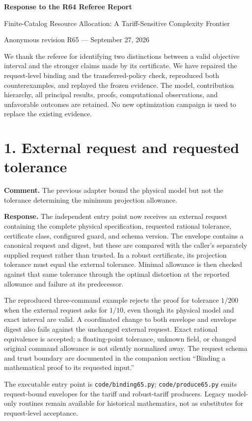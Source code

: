 \documentclass[11pt,letterpaper]{article}
\begin{document}
\begin{center}{\Large\bfseries Response to the R64 Referee Report}\par
Finite-Catalog Resource Allocation: A Tariff-Sensitive Complexity Frontier\par
Anonymous revision R65 --- September 27, 2026\end{center}
We thank the referee for identifying two distinctions between a valid objective interval and the stronger claims made by its certificate. We have repaired the request-level binding and the transferred-policy check, reproduced both counterexamples, and replayed the frozen evidence. The model, contribution hierarchy, all principal results, proofs, computational observations, and unfavorable outcomes are retained. No new optimization campaign is used to replace the existing evidence.

\section*{1. External request and requested tolerance}
\textbf{Comment.} The previous adapter bound the physical model but not the tolerance determining the minimum projection allowance.

\textbf{Response.} The independent entry point now receives an external request containing the complete physical specification, requested rational tolerance, certificate class, configured guard, and schema version. The envelope contains a canonical request and digest, but these are compared with the caller's separately supplied request rather than trusted. In a robust certificate, its projection tolerance must equal the external tolerance. Minimal allowance is then checked against that same tolerance through the optimal distortion at the reported allowance and failure at its predecessor.

The reproduced three-command example rejects the proof for tolerance $1/200$ when the external request asks for $1/10$, even though its physical model and exact interval are valid. A coordinated change to both envelope and envelope digest also fails against the unchanged external request. Exact rational equivalence is accepted; a floating-point tolerance, unknown field, or changed original command allowance is not silently normalized away. The request schema and trust boundary are documented in the companion section ``Binding a mathematical proof to its requested input.''

The executable entry point is \texttt{code/binding65.py}; \texttt{code/produce65.py} emits request-bound envelopes for the tariff and robust-tariff producers. Legacy model-only routines remain available for historical mathematics, not as substitutes for request-level acceptance.
\end{document}
